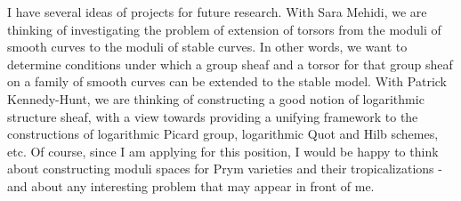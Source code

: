 \documentclass[12pt]{extarticle}
\begin{document}
I have several ideas of projects for future research. With Sara Mehidi, we are thinking of investigating the problem of extension of torsors from the moduli of smooth curves to the moduli of stable curves. In other words, we want to determine conditions under which a group sheaf and a torsor for that group sheaf on a family of smooth curves can be extended to the stable model. With Patrick Kennedy-Hunt, we are thinking of constructing a good notion of logarithmic structure sheaf, with a view towards providing a unifying framework to the constructions of logarithmic Picard group, logarithmic Quot and Hilb schemes, etc. Of course, since I am applying for this position, I would be happy to think about constructing moduli spaces for Prym varieties and their tropicalizations - and about any interesting problem that may appear in front of me.



\end{document}
